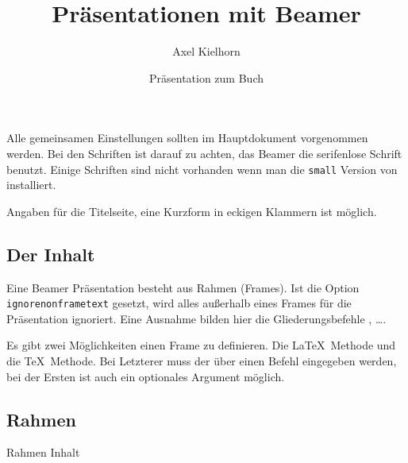 Alle gemeinsamen Einstellungen sollten im Hauptdokument vorgenommen werden.
Bei den Schriften ist darauf zu achten, das Beamer die serifenlose Schrift benutzt.
Einige Schriften sind nicht vorhanden wenn man die \texttt{small} Version von 
\TeXLive{} installiert.

\begin{lfgwcode}{}
\usepackage[utf8]{inputenc}
\usepackage[german]{babel}
%
%
\usepackage[TS1,T1]{fontenc}
\usepackage{dejavu}
\end{lfgwcode}

Angaben für die Titelseite, eine Kurzform in eckigen Klammern ist möglich.

\begin{lfgwcode}{}
\title{Präsentationen mit Beamer}
\author{Axel Kielhorn}
\date[LFGW]{Präsentation zum Buch}
\end{lfgwcode}

\subsection{Der Inhalt}

\begin{lfgwcode}{}

\end{lfgwcode}

Eine Beamer Präsentation besteht aus Rahmen (Frames).
Ist die Option \texttt{ignorenonframetext} gesetzt, wird alles außerhalb
eines Frames für die Präsentation ignoriert. Eine Ausnahme bilden hier 
die Gliederungsbefehle , \dots.

Es gibt zwei Möglichkeiten einen Frame zu definieren.
Die \LaTeX\ Methode und die \TeX\ Methode. Bei Letzterer muss der
 über einen Befehl eingegeben werden, bei der Ersten ist
auch ein optionales Argument möglich. 

\subsection{Rahmen}
\begin{lfgwcode}{}
\begin{frame}{Rahmen}
    Inhalt
\end{frame}

\end{lfgwcode}

